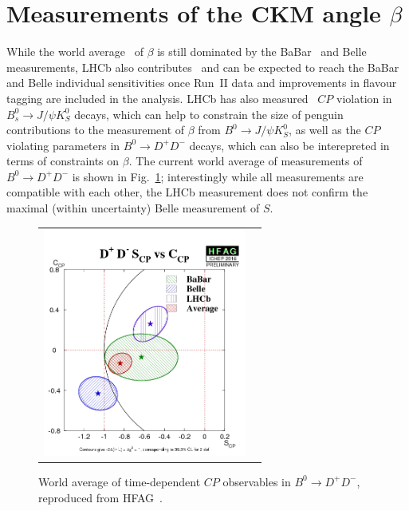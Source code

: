\section{Measurements of the CKM angle $\beta$}
\label{sec:beta}

While the world average~\cite{HFAG} of $\beta$ is still dominated
by the BaBar~\cite{} and Belle~\cite{} measurements, LHCb also contributes~\cite{LHCb-PAPER-2012-035} and can be expected
to reach the BaBar and Belle individual sensitivities once Run~II data and
improvements in flavour tagging are included in the analysis. LHCb has also measured~\cite{LHCb-PAPER-2015-005}
$CP$ violation in $B^0_s \to J/\psi K^0_S$ decays,
which can help to constrain the size of penguin contributions to the measurement
of $\beta$ from $B^0 \to J/\psi K^0_S$, as well as the $CP$ violating parameters in
$B^0 \to D^+ D^-$ decays, which can also be interepreted in terms of constraints on $\beta$.
The current world average of measurements of $B^0 \to D^+ D^-$ is shown in Fig.~\ref{b2ddwa}; 
interestingly while all measurements are compatible with each other, the LHCb measurement
does not confirm the maximal (within uncertainty) Belle measurement of $S$.

\begin{figure}
  \begin{center}
    \begin{tabular}{c c}
      \includegraphics[height=7.5cm]{figs/D+D-S_CPvsC_CP.png} &
    \end{tabular}
  \end{center}
  \vspace{-0.5cm}
  \caption{\label{b2ddwa}World average of time-dependent $CP$ observables in $B^0 \to D^+ D^-$, reproduced from HFAG~\cite{HFAG}.}
\end{figure}

